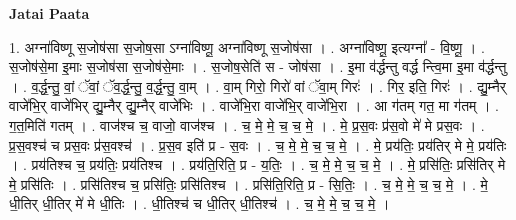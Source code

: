 \documentclass[17pt]{extarticle}
\begin{document}
\textbf{Jatai Paata} \newline

1. अग्ना॑विष्णू स॒जोष॑सा स॒जोष॒सा ऽग्ना॑विष्णू॒ अग्ना॑विष्णू स॒जोष॑सा । . अग्ना॑विष्णू॒ इत्यग्ना᳚ - वि॒ष्णू॒ । . स॒जोष॑से॒मा इ॒माः स॒जोष॑सा स॒जोष॑से॒माः । . स॒जोष॒सेति॑ स - जोष॑सा । . इ॒मा व॑र्द्धन्तु वर्द्ध न्त्वि॒मा इ॒मा व॑र्द्धन्तु । . व॒र्द्ध॒न्तु॒ वां॒ ॅवां॒ ॅव॒र्द्ध॒न्तु॒ व॒र्द्ध॒न्तु॒ वा॒म् । . वा॒म् गिरो॒ गिरो॑ वां ॅवा॒म् गिरः॑ । . गिर॒ इति॒ गिरः॑ । . द्यु॒म्नैर् वाजे॑भि॒र् वाजे॑भिर् द्यु॒म्नैर् द्यु॒म्नैर् वाजे॑भिः । . वाजे॑भि॒रा वाजे॑भि॒र् वाजे॑भि॒रा । . आ ग॑तम् गत॒ मा ग॑तम् । . ग॒त॒मिति॑ गतम् । . वाज॑श्च च॒ वाजो॒ वाज॑श्च । . च॒ मे॒ मे॒ च॒ च॒ मे॒ । . मे॒ प्र॒स॒वः प्र॑स॒वो मे॑ मे प्रस॒वः । . प्र॒स॒वश्च॑ च प्रस॒वः प्र॑स॒वश्च॑ । . प्र॒स॒व इति॑ प्र - स॒वः । . च॒ मे॒ मे॒ च॒ च॒ मे॒ । . मे॒ प्रय॑तिः॒ प्रय॑तिर् मे मे॒ प्रय॑तिः । . प्रय॑तिश्च च॒ प्रय॑तिः॒ प्रय॑तिश्च । . प्रय॑ति॒रिति॒ प्र - य॒तिः॒ । . च॒ मे॒ मे॒ च॒ च॒ मे॒ । . मे॒ प्रसि॑तिः॒ प्रसि॑तिर् मे मे॒ प्रसि॑तिः । . प्रसि॑तिश्च च॒ प्रसि॑तिः॒ प्रसि॑तिश्च । . प्रसि॑ति॒रिति॒ प्र - सि॒तिः॒ । . च॒ मे॒ मे॒ च॒ च॒ मे॒ । . मे॒ धी॒तिर् धी॒तिर् मे॑ मे धी॒तिः । . धी॒तिश्च॑ च धी॒तिर् धी॒तिश्च॑ । . च॒ मे॒ मे॒ च॒ च॒ मे॒ । \newline
\end{document}
